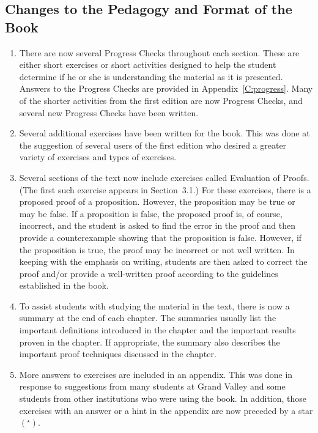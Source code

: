 \subsection*{Changes to the Pedagogy and Format of the Book}
\begin{enumerate}
\item There are now several Progress Checks throughout each section.  These are either short exercises or short activities designed to help the student determine if he or she is understanding the material as it is presented.  Answers to the Progress Checks are provided in Appendix~\ref{C:progress}.  Many of the shorter activities from the first edition are now Progress Checks, and several new Progress Checks have been written.


\item Several additional exercises have been written for the book.  This was done at the suggestion of several users of the first edition who desired a greater variety of exercises and types of exercises.

\item Several sections of the text now include exercises called Evaluation of Proofs.  (The first such exercise appears in Section~3.1.)  For these exercises, there is a proposed proof of a proposition.  However, the proposition may be true or may be false.  If a proposition is false, the proposed proof is, of course, incorrect, and the student is asked to find the error in the proof and then provide a counterexample showing that the proposition is false.  However, if the proposition is true, the proof may be incorrect or not well written.  In keeping with the emphasis on writing, students are then asked to correct the proof and/or provide a well-written proof according to the guidelines established in the book.

\item To assist students with studying the material in the text, there is now a summary at the end of each chapter.  The summaries usually list the important definitions introduced in the chapter and the important results proven in the chapter.  If appropriate, the summary also describes the important proof techniques discussed in the chapter.

\item More answers to exercises are included in an appendix.  This was done in response to suggestions from many students at Grand Valley and some students from other institutions who were using the book.  In addition, those exercises with an answer or a hint in the appendix are now preceded by a star 
$\left( ^\star \right)$.
\end{enumerate}

